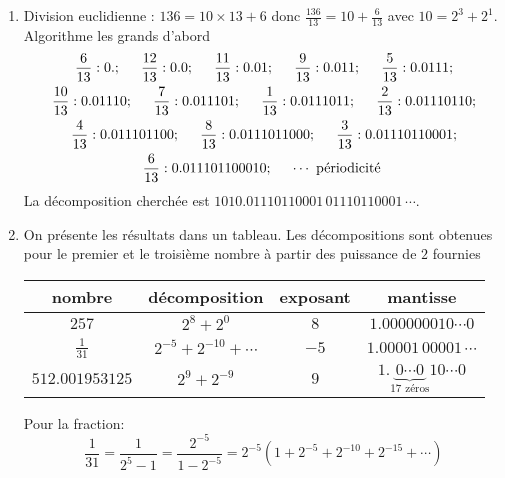 \begin{enumerate}
  \item Division euclidienne : $136 = 10 \times 13 + 6$ donc $\frac{136}{13} = 10 + \frac{6}{13}$ avec $10 = 2^3 + 2^1$.\newline
Algorithme \og les grands d'abord\fg
\begin{multline*}
\frac{6}{13}: 0. ;\hspace{0.5cm} \frac{12}{13}: 0.0 ;\hspace{0.5cm} \frac{11}{13}: 0.01 ;\hspace{0.5cm} \frac{9}{13}: 0.011 ;\hspace{0.5cm} \frac{5}{13}: 0.0111;\\
\frac{10}{13}: 0.01110 ;\hspace{0.5cm} \frac{7}{13}: 0.011101 ;\hspace{0.5cm}\frac{1}{13}: 0.0111011 ;\hspace{0.5cm}\frac{2}{13}: 0.01110110 ;\\
\frac{4}{13}: 0.011101100 ;\hspace{0.5cm}\frac{8}{13}: 0.0111011000;\hspace{0.5cm} \frac{3}{13}: 0.01110110001;\\
\frac{6}{13}: 0.011101100010;\hspace{0.5cm} \cdots  \text{ périodicité }
\end{multline*}
La décomposition cherchée est $ 1010.01110110001\,01110110001\, \cdots$.

  \item On présente les résultats dans un tableau. Les décompositions sont obtenues pour le premier et le troisième nombre à partir des puissance de $2$ fournies
\begin{center}
\renewcommand{\arraystretch}{1.6}
\begin{tabular}{|c|c|c|c|} \hline
nombre          & décomposition             & exposant & mantisse                 \\ \hline
$257$           & $2^8 + 2^0$               & $8$      & $1.000000010\cdots0$     \\ \hline
$\frac{1}{31}$  & $2^{-5} + 2^{-10}+\cdots$ & $-5$     & $1.00001\,00001\,\cdots$ \\ \hline
$512.001953125$ & $2^9 + 2^{-9}$            & $9$      & $1. \underset{17 \text{ zéros}}{\underbrace{0\cdots0}} 10\cdots 0$\\ \hline
\end{tabular}
\end{center}
Pour la fraction:
\begin{displaymath}
  \frac{1}{31} = \frac{1}{2^5 - 1} = \frac{2^{-5}}{1-2^{-5}} = 2^{-5}\left(1 + 2^{-5} + 2^{-10} + 2^{-15} + \cdots  \right) 
\end{displaymath}


\end{enumerate}
